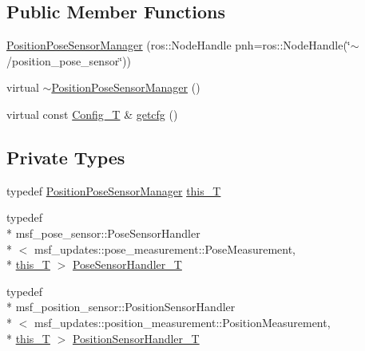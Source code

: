 \subsection*{Public Member Functions}
\begin{DoxyCompactItemize}
\item 
\hyperlink{classmsf__updates_1_1PositionPoseSensorManager_a1c7e00dee14d96d81608e992a3e92d92}{Position\-Pose\-Sensor\-Manager} (ros\-::\-Node\-Handle pnh=ros\-::\-Node\-Handle(\char`\"{}$\sim$/position\-\_\-pose\-\_\-sensor\char`\"{}))
\item 
virtual \hyperlink{classmsf__updates_1_1PositionPoseSensorManager_abd2647fa7a03fd9d560b18c039e0c4fd}{$\sim$\-Position\-Pose\-Sensor\-Manager} ()
\item 
virtual const \hyperlink{namespacemsf__updates_a4f0eca6cc27f15ff678a81cb92219824}{Config\-\_\-\-T} \& \hyperlink{classmsf__updates_1_1PositionPoseSensorManager_a65f636b251507b4a0efd4cf7d50733da}{getcfg} ()
\end{DoxyCompactItemize}
\subsection*{Private Types}
\begin{DoxyCompactItemize}
\item 
typedef \hyperlink{classmsf__updates_1_1PositionPoseSensorManager}{Position\-Pose\-Sensor\-Manager} \hyperlink{classmsf__updates_1_1PositionPoseSensorManager_adec81fc8eedb43f95a313b739e563cd6}{this\-\_\-\-T}
\item 
typedef \\*
msf\-\_\-pose\-\_\-sensor\-::\-Pose\-Sensor\-Handler\\*
$<$ msf\-\_\-updates\-::pose\-\_\-measurement\-::\-Pose\-Measurement, \\*
\hyperlink{classmsf__updates_1_1PositionPoseSensorManager_adec81fc8eedb43f95a313b739e563cd6}{this\-\_\-\-T} $>$ \hyperlink{classmsf__updates_1_1PositionPoseSensorManager_a2a693b6e7df64fdea061dc5f67fdeb3e}{Pose\-Sensor\-Handler\-\_\-\-T}
\item 
typedef \\*
msf\-\_\-position\-\_\-sensor\-::\-Position\-Sensor\-Handler\\*
$<$ msf\-\_\-updates\-::position\-\_\-measurement\-::\-Position\-Measurement, \\*
\hyperlink{classmsf__updates_1_1PositionPoseSensorManager_adec81fc8eedb43f95a313b739e563cd6}{this\-\_\-\-T} $>$ \hyperlink{classmsf__updates_1_1PositionPoseSensorManager_a451520e036c4a2a4c67b852bbd6d7f99}{Position\-Sensor\-Handler\-\_\-\-T}
\end{DoxyCompactItemize}
